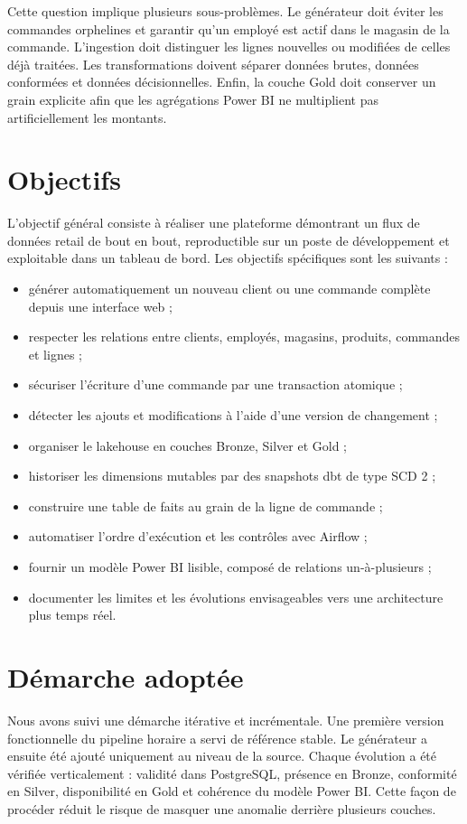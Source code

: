 Cette question implique plusieurs sous-problèmes. Le générateur doit éviter les commandes orphelines et garantir qu'un employé est actif dans le magasin de la commande. L'ingestion doit distinguer les lignes nouvelles ou modifiées de celles déjà traitées. Les transformations doivent séparer données brutes, données conformées et données décisionnelles. Enfin, la couche Gold doit conserver un grain explicite afin que les agrégations Power BI ne multiplient pas artificiellement les montants.

\section*{Objectifs}
L'objectif général consiste à réaliser une plateforme démontrant un flux de données retail de bout en bout, reproductible sur un poste de développement et exploitable dans un tableau de bord. Les objectifs spécifiques sont les suivants :

\begin{itemize}[leftmargin=1.1cm]
  \item générer automatiquement un nouveau client ou une commande complète depuis une interface web ;
  \item respecter les relations entre clients, employés, magasins, produits, commandes et lignes ;
  \item sécuriser l'écriture d'une commande par une transaction atomique ;
  \item détecter les ajouts et modifications à l'aide d'une version de changement ;
  \item organiser le lakehouse en couches Bronze, Silver et Gold ;
  \item historiser les dimensions mutables par des snapshots dbt de type SCD 2 ;
  \item construire une table de faits au grain de la ligne de commande ;
  \item automatiser l'ordre d'exécution et les contrôles avec Airflow ;
  \item fournir un modèle Power BI lisible, composé de relations un-à-plusieurs ;
  \item documenter les limites et les évolutions envisageables vers une architecture plus temps réel.
\end{itemize}

\section*{Démarche adoptée}
Nous avons suivi une démarche itérative et incrémentale. Une première version fonctionnelle du pipeline horaire a servi de référence stable. Le générateur a ensuite été ajouté uniquement au niveau de la source. Chaque évolution a été vérifiée verticalement : validité dans PostgreSQL, présence en Bronze, conformité en Silver, disponibilité en Gold et cohérence du modèle Power BI. Cette façon de procéder réduit le risque de masquer une anomalie derrière plusieurs couches.

